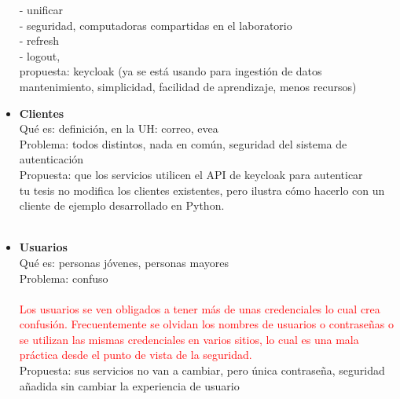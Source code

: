 \begin{itemize}
	- unificar\\
	- seguridad, computadoras compartidas en el laboratorio\\
	- refresh\\
	- logout, \\
	propuesta: keycloak (ya se está usando para ingestión de datos mantenimiento, simplicidad, facilidad de aprendizaje, menos recursos)
	\\
	\item \textbf{Clientes}\\
	Qué es: definición, en la UH: correo, evea\\
	Problema: todos distintos, nada en común, seguridad del sistema de autenticación\\
	Propuesta: que los servicios utilicen el API de keycloak para autenticar\\
	tu tesis no modifica los clientes existentes, pero ilustra cómo hacerlo con un cliente de ejemplo desarrollado en Python.\\
	\\
	\item \textbf{Usuarios}\\
	Qué es: personas jóvenes, personas mayores\\
	Problema: confuso\\
	\\
	\textcolor{red}{Los usuarios se ven obligados a tener más de unas credenciales lo cual crea confusión. Frecuentemente se olvidan los nombres de usuarios o contraseñas o se utilizan las mismas credenciales en varios sitios, lo cual es una mala práctica desde el punto de vista de la seguridad.}
	\\
	Propuesta: sus servicios no van a cambiar, pero única contraseña, seguridad añadida sin cambiar la experiencia de usuario
	
\end{itemize} 

